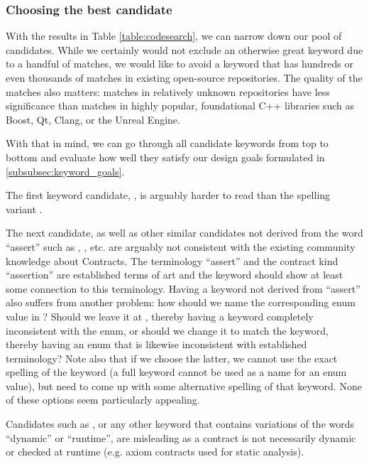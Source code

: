 
\subsubsection{Choosing the best candidate}

With the results in Table \ref{table:codesearch}, we can narrow down our pool of candidates. While we certainly would not exclude an otherwise great keyword due to a handful of matches, we would like to avoid a keyword that has hundreds or even thousands of matches in existing open-source repositories. The quality of the matches also matters: matches in relatively unknown repositories have less significance than matches in highly popular, foundational C++ libraries such as Boost, Qt, Clang, or the Unreal Engine.

With that in mind, we can go through all candidate keywords from top to bottom and evaluate how well they satisfy our design goals formulated in \ref{subsubsec:keyword_goals}.

\pagebreak %

The first keyword candidate, , is arguably harder to read than the spelling variant \mbox{}.

The next candidate,  as well as other similar candidates not derived from the word ``assert'' such as , , etc. are arguably not consistent with the existing community knowledge about Contracts. The terminology ``assert'' and the contract kind ``assertion'' are established terms of art and the keyword should show at least some connection to this terminology. Having a keyword not derived from ``assert'' also suffers from another problem: how should we name the corresponding enum value in \mbox{}? Should we leave it at , thereby having a keyword completely inconsistent with the enum, or should we change it to match the keyword, thereby having an enum that is likewise inconsistent with established terminology? Note also that if we choose the latter, we cannot use the exact spelling of the keyword (a full keyword cannot be used as a name for an enum value), but need to come up with some alternative spelling of that keyword. None of these options seem particularly appealing.

Candidates such as , or any other keyword that contains variations of the words ``dynamic'' or ``runtime'', are misleading as a contract is not necessarily dynamic or checked at runtime (e.g. axiom contracts used for static analysis).

